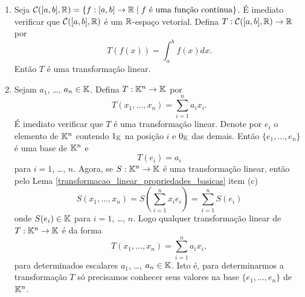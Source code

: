\begin{exemplo}
\begin{enumerate}
		\item Seja $\mathcal{C}([a,b], \mathbb{R}) = \{ f : [a,b] \to \mathbb{R} \mid f \mbox{ é uma função contínua}\}$. É imediato verificar que $\mathcal{C}([a,b], \mathbb{R})$ é um $\mathbb{R}$-espaço vetorial. Defina $T : \mathcal{C}([a,b], \mathbb{R}) \to \mathbb{R}$ por
		\[
			T(f(x)) = \int_a^bf(x)dx.
		\]
		Então $T$ é uma transformação linear.

		\item Sejam $a_1$, \dots, $a_n \in \mathbb{K}$. Defina $T : \mathbb{K}^n \to \mathbb{K}$ por
		\[
			T(x_1, \dots, x_n) = \sum_{i=1}^na_ix_i.
		\]
		É imediato verificar que $T$ é uma transformação linear. Denote por $e_i$ o elemento de $\mathbb{K}^n$ contendo $1_{\mathbb{K}}$ na posição $i$ e $0_{\mathbb{K}}$ das demais. Então $\{e_1, \dots, e_n\}$ é uma base de $\mathbb{K}^n$ e
		\[
			T(e_i) = a_i
		\]
		para $i = 1$, \dots, $n$. Agora, se $S : \mathbb{K}^n \to \mathbb{K}$ é uma transformação linear, então pelo Lema \ref{transformacao_linear_propriedades_basicas} item (c)
		\[
			S(x_1, \dots, x_n) = S(\sum_{i=1}^nx_ie_i) = \sum_{i=1}^nS(e_i)
		\]
		onde $S(e_i) \in \mathbb{K}$ para $i = 1$, \dots, $n$. Logo qualquer transformação linear de $T : \mathbb{K}^n \to \mathbb{K}$ é da forma
		\[
			T(x_1, \dots, x_n) = \sum_{i=1}^na_ix_i,
		\]
		para determinados escalares $a_1$, \dots, $a_n \in \mathbb{K}$. Isto é, para determinarmos a transformação $T$ só precisamos conhecer seus valores na base $\{e_1, \dots, e_n\}$ de $\mathbb{K}^n$.
	\end{enumerate}
\end{exemplo}


